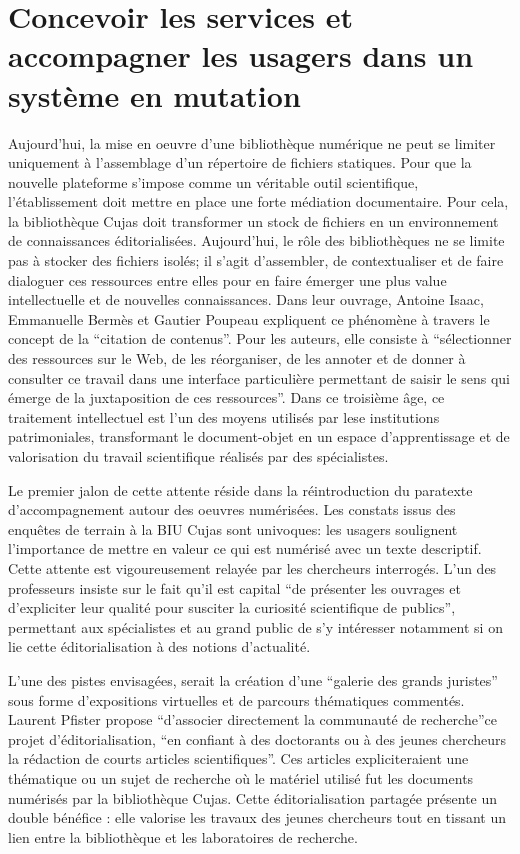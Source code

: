\section[Conception et accompagnement]{Concevoir les services et accompagner les usagers dans un système en mutation}
Aujourd'hui, la mise en oeuvre d'une bibliothèque numérique ne peut se limiter uniquement à l'assemblage d'un répertoire de fichiers statiques. Pour que la nouvelle plateforme s'impose comme un véritable outil scientifique, l'établissement doit mettre en place une forte médiation documentaire. Pour cela, la bibliothèque Cujas doit transformer un stock de fichiers en un environnement de connaissances éditorialisées. Aujourd'hui, le rôle des bibliothèques ne se limite pas à stocker des fichiers isolés; il s'agit d'assembler, de contextualiser et de faire dialoguer ces ressources entre elles pour en faire émerger une plus value intellectuelle et de nouvelles connaissances. Dans leur ouvrage, Antoine Isaac, Emmanuelle Bermès et Gautier Poupeau expliquent ce phénomène à travers le concept de la \enquote{citation de contenus}. Pour les auteurs, elle consiste à \enquote{sélectionner des ressources sur le Web, de les réorganiser, de les annoter et de donner à consulter ce travail dans une interface particulière permettant de saisir le sens qui émerge de la juxtaposition de ces ressources}. Dans ce troisième âge, ce traitement intellectuel est l'un des moyens utilisés par lese institutions patrimoniales, transformant le document-objet en un espace d'apprentissage et de valorisation du travail scientifique réalisés par des spécialistes. 

Le premier jalon de cette attente réside dans la réintroduction du paratexte d'accompagnement autour des oeuvres numérisées. Les constats issus des enquêtes de terrain à la BIU Cujas sont univoques: les usagers soulignent l'importance de mettre en valeur ce qui est numérisé avec un texte descriptif. Cette attente est vigoureusement relayée par les chercheurs interrogés. L'un des professeurs insiste sur le fait qu'il est capital \enquote{de présenter les ouvrages et d'expliciter leur qualité pour susciter la curiosité scientifique de publics}, permettant aux spécialistes et au grand public de s'y intéresser notamment si on lie cette éditorialisation à des notions d'actualité.

L'une des pistes envisagées, serait la création d'une \enquote{galerie des grands juristes} sous forme d'expositions virtuelles et de parcours thématiques commentés. Laurent Pfister propose \enquote{d'associer directement la communauté de recherche}ce projet d'éditorialisation, \enquote{en confiant à des doctorants ou à des jeunes chercheurs la rédaction de courts articles scientifiques}. Ces articles expliciteraient une thématique ou un sujet de recherche où le matériel utilisé fut les documents numérisés par la bibliothèque Cujas. Cette éditorialisation partagée présente un double bénéfice : elle valorise les travaux des jeunes chercheurs tout en tissant un lien entre la bibliothèque et les laboratoires de recherche.


